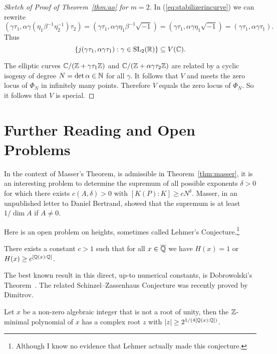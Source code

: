 \begin{proof}[Sketch of Proof of Theorem~\ref{thm:ao} for $m=2$]
  
  In (\ref{eq:stabilizerincurve})  we can rewrite
  \begin{equation*}
    (\gamma \tau_1, \alpha \gamma(\eta_1
    \beta^{-1}\eta_2^{-1})\tau_2) =
    (\gamma\tau_1,\alpha\gamma \eta_1\beta^{-1}\sqrt{-1})
    =
        (\gamma\tau_1,\alpha\gamma \eta_1\sqrt{-1})=
    (\gamma\tau_1, \alpha \gamma\tau_1).
  \end{equation*}
  Thus
  $$    \{j(\gamma\tau_1,\alpha\gamma\tau_1) : \gamma \in \mathrm{SL}_2({\mathbb{R}})\}
  \subseteq V({\mathbb{C}}). $$
  
  The elliptic curves ${\mathbb{C}}/({\mathbb{Z}}+\gamma\tau_1{\mathbb{Z}})$ and
  ${\mathbb{C}}/({\mathbb{Z}}+\alpha\gamma\tau_2{\mathbb{Z}})$ are related by a cyclic isogeny of degree
  $N=\det\alpha\in{\mathbb{N}}$ for all $\gamma$. It follows that $V$ and meets
  the zero locus of $\Phi_N$ in infinitely many points. Therefore $V$
  equals the zero locus of $\Phi_N$.   So it follows that $V$ is special.
\end{proof}
\section{Further Reading and Open Problems}

In the context of Masser's Theorem, is admissible in
Theorem~\ref{thm:masser}, it is an interesting problem to determine
the supremum of all possible exponents $\delta>0$ for which there
exists $c(A,\delta)>0$ with $[K(P):K]\ge c N^{\delta}$. Masser, in an
unpublished letter to Daniel Bertrand, showed that the supremum is at
least $1/\dim A$ if $A\not=0$. 

Here is an open problem on heights, sometimes called Lehmer's
Conjecture.\footnote{Although I know no evidence that Lehmer actually
  made this conjecture.}

\begin{conjecture}
  There exists a constant $c>1$ such that for all $x\in{\overline{\mathbb{Q}}}$ we have
  $H(x)=1$ or $H(x) \ge c^{[{\mathbb{Q}}(x):{\mathbb{Q}}]}$.
\end{conjecture}

The best known result in this direct, up-to numerical constants, is
Dobrowolski's Theorem~\cite{Dobrowolski:79}.
The related Schinzel--Zassenhaus Conjecture was recently proved by
Dimitrov.

\begin{theorem}
  Let $x$ be a non-zero algebraic integer that is not a root of unity,
  then the ${\mathbb{Z}}$-minimal polynomial of $x$ has a complex root $z$ with
  $|z|\ge 2^{1/(4[{\mathbb{Q}}(x):{\mathbb{Q}}])}$. 
\end{theorem}

